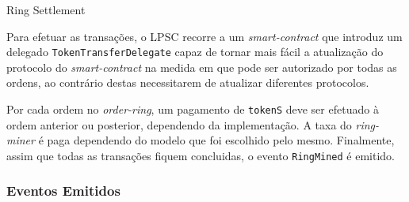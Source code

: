 \documentclass[UTF8,nofonts]{article}
\makeatletter
\newenvironment{figurehere}
 {\def\@captype{figure}}
 {}
\makeatother
\begin{document}
\begin{multicols}{2}
\begin{enumerate}
\begin{center}
\begin{figurehere}
\caption{Ring Settlement}
\label{fig:settlement}
\end{figurehere}
\end{center}


Para efetuar as transações, o LPSC recorre a um \textit{smart-contract} que introduz um delegado \verb|TokenTransferDelegate| capaz de tornar mais fácil a atualização do protocolo do \textit{smart-contract} na medida em que pode ser autorizado por todas as ordens, ao contrário destas necessitarem de atualizar diferentes protocolos.


Por cada ordem no \textit{order-ring}, um pagamento de \verb|tokenS| deve ser efetuado à ordem anterior ou posterior, dependendo da implementação.
A taxa do \textit{ring-miner} é paga dependendo do modelo que foi escolhido pelo mesmo. Finalmente, assim que todas as transações fiquem concluidas, o evento 
\verb|RingMined| é emitido.

\subsubsection{Eventos Emitidos\label{sec:events}}



\end{enumerate}
\end{multicols}
\end{document}
